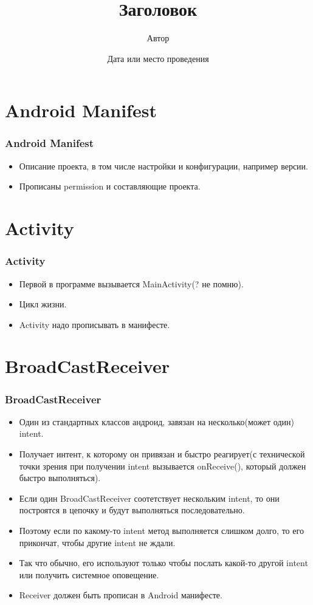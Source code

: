 \documentclass[utf8]{beamer}
\title{Заголовок}
\date{Дата или место проведения}
\author{Автор}
\begin{document}
\begin{frame}
    \titlepage
\end{frame}

\section{Android Manifest}
\begin{frame}
    \frametitle{Android Manifest}
    \begin{itemize}
    	\item Описание проекта, в том числе настройки и конфигурации, например версии.
    	\item Прописаны permission и составляющие проекта.
    \end{itemize}
\end{frame}

\section{Activity}
\begin{frame}
    \frametitle{Activity}
    \begin{itemize}
    	\item Первой в программе вызывается MainActivity(? не помню).
    	\item Цикл жизни.
   		\item Activity надо прописывать в манифесте.
   	\end{itemize}
\end{frame}

\section{BroadCastReceiver}
\begin{frame}
    \frametitle{BroadCastReceiver}
    \begin{itemize}
        \item Один из стандартных классов андроид, завязан на несколько(может один) intent. 
	    \item Получает интент, к которому он привязан и \alert{быстро} реагирует(с технической точки зрения при получении intent вызывается onReceive(), который должен быстро выполняться).
		\item Если один BroadCastReceiver соотетствует нескольким intent, то они построятся в цепочку и будут выполняться последовательно.
		\item Поэтому если по какому-то intent метод выполняется слишком долго, то его прикончат, чтобы другие intent не ждали.
		\item Так что обычно, его используют только чтобы послать какой-то другой intent или получить системное оповещение.
		\item Receiver должен быть прописан в Android манифесте.
    \end{itemize}
\end{frame}
\end{document}
